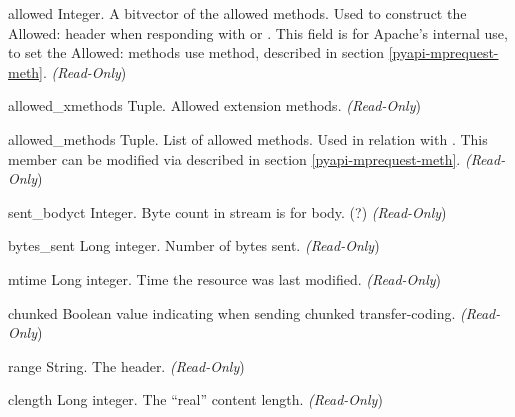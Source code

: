 \begin{memberdesc}[request]{allowed}
  Integer. A bitvector of the allowed methods. Used to construct the
  Allowed: header when responding with
   or
  . This field is for Apache's internal
  use, to set the Allowed: methods use 
  method, described in section \ref{pyapi-mprequest-meth}. 
  \emph{(Read-Only})
\end{memberdesc}

\begin{memberdesc}[request]{allowed_xmethods}
  Tuple. Allowed extension methods.
  \emph{(Read-Only})
\end{memberdesc}

\begin{memberdesc}[request]{allowed_methods}
  Tuple. List of allowed methods. Used in relation with
  . This member can be modified via  
  described in section \ref{pyapi-mprequest-meth}.
  \emph{(Read-Only})
\end{memberdesc}

\begin{memberdesc}[request]{sent_bodyct}
  Integer. Byte count in stream is for body. (?)
  \emph{(Read-Only})
\end{memberdesc}

\begin{memberdesc}[request]{bytes_sent}
  Long integer. Number of bytes sent.
  \emph{(Read-Only})
\end{memberdesc}

\begin{memberdesc}[request]{mtime}
  Long integer. Time the resource was last modified.
  \emph{(Read-Only})
\end{memberdesc}

\begin{memberdesc}[request]{chunked}
  Boolean value indicating when sending chunked transfer-coding.
  \emph{(Read-Only})
\end{memberdesc}

\begin{memberdesc}[request]{range}
  String. The  header.
  \emph{(Read-Only})
\end{memberdesc}

\begin{memberdesc}[request]{clength}
  Long integer. The ``real'' content length.
  \emph{(Read-Only})
\end{memberdesc}

